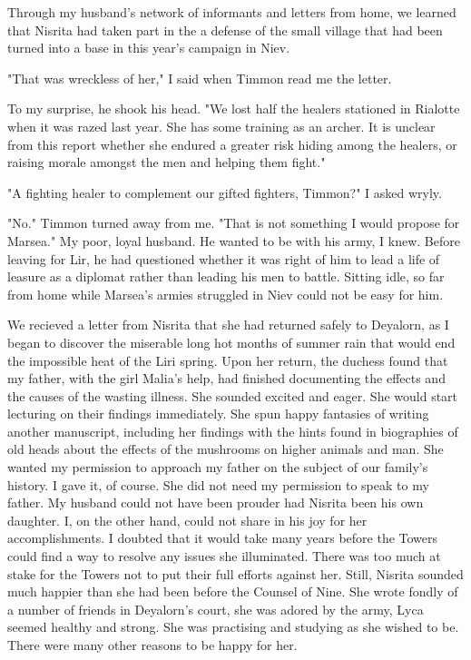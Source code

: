 \documentclass{article}
\begin{document}
\vspace{.5cm}

Through my husband's network of informants and letters from home, we learned that Nisrita had taken part in the a defense of the small village that had been turned into a base in this year's campaign in Niev. 

"That was wreckless of her," I said when Timmon read me the letter.

To my surprise, he shook his head. "We lost half the healers stationed in Rialotte when it was razed last year. She has some training as an archer. It is unclear from this report whether she endured a greater risk hiding among the healers, or raising morale amongst the men and helping them fight."

"A fighting healer to complement our gifted fighters, Timmon?" I asked wryly.

"No." Timmon turned away from me. "That is not something I would propose for Marsea." My poor, loyal husband. He wanted to be with his army, I knew. 
Before leaving for Lir, he had questioned whether it was right of him to lead a life of leasure as a diplomat rather than leading his men to battle. Sitting idle, so far from home while Marsea's armies struggled in Niev could not be easy for him.

We recieved a letter from Nisrita that she had returned safely to Deyalorn, as I began to discover the miserable long hot months of summer rain that would end the impossible heat of the Liri spring. Upon her return, the duchess found that my father,  with the girl Malia's help, had finished documenting the effects and the causes of the wasting illness. She sounded excited and eager. She would start lecturing on their findings immediately. She spun happy fantasies of writing another manuscript, including her findings with the hints found in biographies of old heads about the effects of the mushrooms on higher animals and man. She wanted my permission to approach my father on the subject of our family's history. I gave it, of course. She did not need my permission to speak to my father. My husband could not have been prouder had Nisrita been his own daughter. I, on the other hand, could not share in his joy for her accomplishments. I doubted that it would take many years before the Towers could find a way to resolve any issues she illuminated. There was too much at stake for the Towers not to put their full efforts against her. Still, Nisrita sounded much happier than she had been before the Counsel of Nine. She wrote fondly of a number of friends in Deyalorn's court, she was adored by the army, Lyca seemed healthy and strong. She was practising and studying as she wished to be. There were many other reasons to be happy for her.
\end{document}
